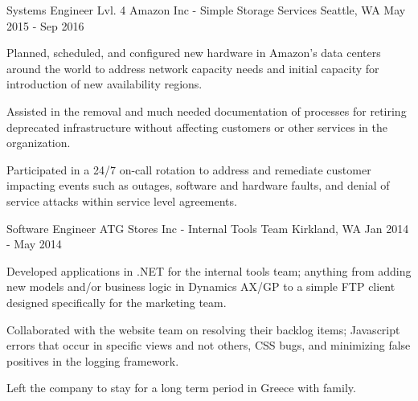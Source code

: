 
    \begin{cventries}
    
    \cventry
    {Systems Engineer Lvl. 4}
    {Amazon Inc - Simple Storage Services}
    {Seattle, WA}
    {May 2015 - Sep 2016}
    {
        \begin{cvitems}
        \item {Planned, scheduled, and configured new hardware in Amazon's data centers around the world to address network capacity needs and initial capacity for introduction of new availability regions.}
        \item {Assisted in the removal and much needed documentation of processes for retiring deprecated infrastructure without affecting customers or other services in the organization.}
        \item {Participated in a 24/7 on-call rotation to address and remediate customer impacting events such as outages, software and hardware faults, and denial of service attacks within service level agreements.}
        \end{cvitems}
    }

    \cventry
    {Software Engineer}
    {ATG Stores Inc - Internal Tools Team}
    {Kirkland, WA}
    {Jan 2014 - May 2014}
    {
        \begin{cvitems}
        \item {Developed applications in .NET for the internal tools team; anything from adding new models and/or business logic in Dynamics AX/GP to a simple FTP client designed specifically for the marketing team.}
        \item {Collaborated with the website team on resolving their backlog items; Javascript errors that occur in specific views and not others, CSS bugs, and minimizing false positives in the logging framework.}
        \item {Left the company to stay for a long term period in Greece with family.}
        \end{cvitems}
    }


\end{cventries}
